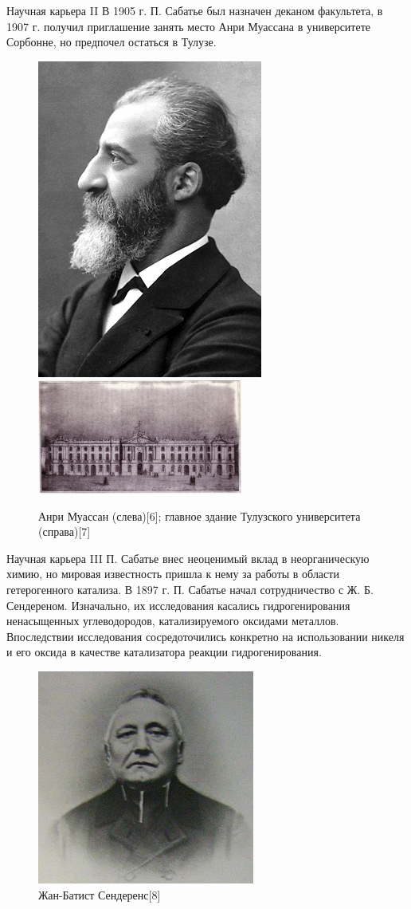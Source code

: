 \documentclass[hyperref={pdfpagelabel=false},usepdftitle=false,xcolor=dvipsnames]{beamer}
\begin{document}
\begin{frame}{Научная карьера II}
		В 1905 г. П. Сабатье был назначен деканом факультета, в 1907 г. получил приглашение занять место Анри Муассана в университете Сорбонне, но предпочел остаться в Тулузе. 
	\begin{figure}
		\includegraphics[width = 0.32\linewidth]{pictures/moissan.jpg}
		\hspace{0.2cm}
		\includegraphics[width=0.5\linewidth, height = 3.75cm]{pictures/capitole.png}
		\caption{Анри Муассан (слева)[6]; главное здание Тулузского университета (справа)[7]}
	\end{figure}
\end{frame}

\begin{frame}{Научная карьера III}
	П. Сабатье внес неоценимый вклад в неорганическую химию, но мировая известность пришла к нему за работы в области гетерогенного катализа. В 1897 г. П. Сабатье начал сотрудничество с Ж. Б. Сендереном. Изначально, их исследования касались гидрогенирования ненасыщенных углеводородов, катализируемого оксидами металлов. Впоследствии исследования сосредоточились конкретно на использовании никеля и его оксида в качестве катализатора реакции гидрогенирования.
\begin{figure}
	\includegraphics[width = 0.27\linewidth]{pictures/senderens.jpg}
	\caption{Жан-Батист Сендеренс[8]}
\end{figure}
\end{frame}
\end{document}
